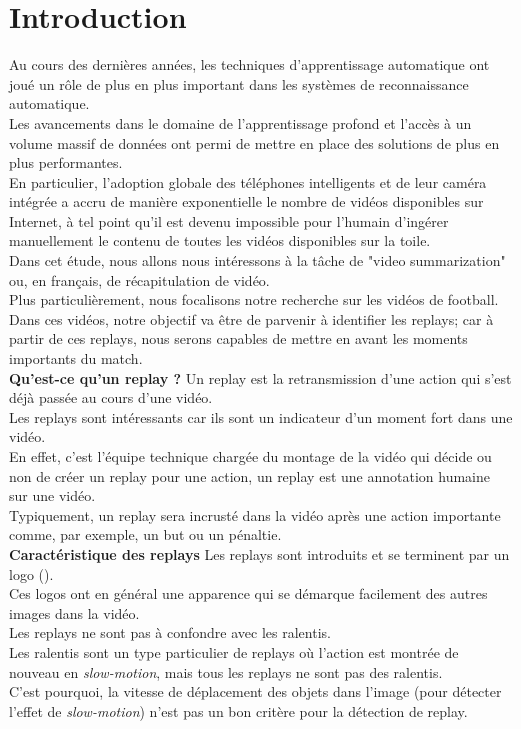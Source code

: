 \documentclass[11pt]{article}
\begin{document}
\newpage
\section{Introduction}
\label{sec:org8fe456f}
Au cours des dernières années, les techniques d'apprentissage automatique ont joué un rôle de plus en plus important dans les systèmes de reconnaissance automatique.\\
Les avancements dans le domaine de l'apprentissage profond et l'accès à un volume massif de données ont permi de mettre en place des solutions de plus en plus performantes.\\
En particulier, l'adoption globale des téléphones intelligents et de leur caméra intégrée a accru de manière exponentielle le nombre de vidéos disponibles sur Internet, à tel point qu'il est devenu impossible pour l'humain d'ingérer manuellement le contenu de toutes les vidéos disponibles sur la toile.\\
Dans cet étude, nous allons nous intéressons à la tâche de "video summarization" ou, en français, de récapitulation de vidéo.\\
Plus particulièrement, nous focalisons notre recherche sur les vidéos de football.\\

Dans ces vidéos, notre objectif va être de parvenir à identifier les replays; car à partir de ces replays, nous serons capables de mettre en avant les moments importants du match.\\

\textbf{Qu'est-ce qu'un replay ?} Un replay est la retransmission d'une action qui s'est déjà passée au cours d'une vidéo.\\
Les replays sont intéressants car ils sont un indicateur d'un moment fort dans une vidéo.\\
En effet, c'est l'équipe technique chargée du montage de la vidéo qui décide ou non de créer un replay pour une action, un replay est une annotation humaine sur une vidéo.\\
Typiquement, un replay sera incrusté dans la vidéo après une action importante comme, par exemple, un but ou un pénaltie.\\

\textbf{Caractéristique des replays} Les replays sont introduits et se terminent par un logo (\cite{Hao_Pan_2002}).\\
Ces logos ont en général une apparence qui se démarque facilement des autres images dans la vidéo.\\
Les replays ne sont pas à confondre avec les ralentis.\\
Les ralentis sont un type particulier de replays où l'action est montrée de nouveau en \emph{slow-motion}, mais tous les replays ne sont pas des ralentis.\\
C'est pourquoi, la vitesse de déplacement des objets dans l'image (pour détecter l'effet de \emph{slow-motion}) n'est pas un bon critère pour la détection de replay.\\
\end{document}

